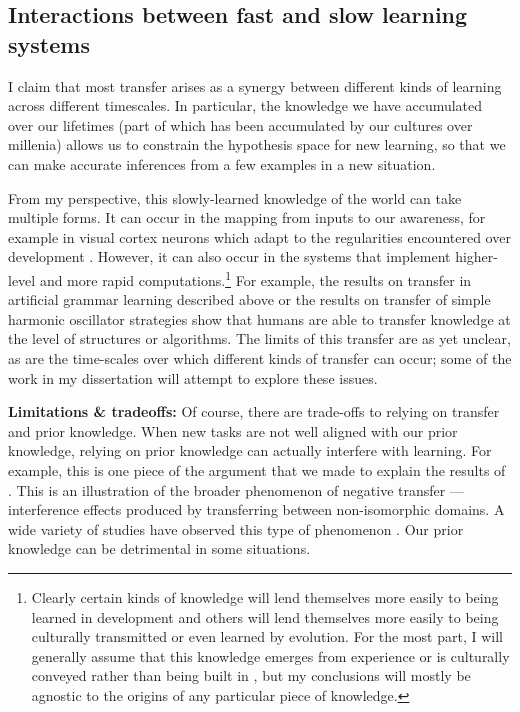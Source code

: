 \subsection{Interactions between fast and slow learning systems} \label{fast_slow_interactions}
I claim that most transfer arises as a synergy between different kinds of learning across different timescales. In particular, the knowledge we have accumulated over our lifetimes (part of which has been accumulated by our cultures over millenia) allows us to constrain the hypothesis space for new learning, so that we can make accurate inferences from a few examples in a new situation. \par 
From my perspective, this slowly-learned knowledge of the world can take multiple forms. It can occur in the mapping from inputs to our awareness, for example in visual cortex neurons which adapt to the regularities encountered over development \citep{Barlow1975}. However, it can also occur in the systems that implement higher-level and more rapid computations.\footnote{Clearly certain kinds of knowledge will lend themselves more easily to being learned in development and others will lend themselves more easily to being culturally transmitted or even learned by evolution. For the most part, I will generally assume that this knowledge emerges from experience or is culturally conveyed rather than being built in \citep{Hansen2017}, but my conclusions will mostly be agnostic to the origins of any particular piece of knowledge.} For example, the results on transfer in artificial grammar learning described above \citep{Tunney2001} or the results on transfer of simple harmonic oscillator strategies \citep{Day2011} show that humans are able to transfer knowledge at the level of structures or algorithms. The limits of this transfer are as yet unclear, as are the time-scales over which different kinds of transfer can occur; some of the work in my dissertation will attempt to explore these issues.\par  
\textbf{Limitations \& tradeoffs:} Of course, there are trade-offs to relying on transfer and prior knowledge. When new tasks are not well aligned with our prior knowledge, relying on prior knowledge can actually interfere with learning. For example, this is one piece of the argument that we made \citep{Lampinen2017b} to explain the results of \citet{Kaminski2008}. This is an illustration of the broader phenomenon of negative transfer --- interference effects produced by transferring between non-isomorphic domains. A wide variety of studies have observed this type of phenomenon \citep[e.g.][]{Luchins1942, Landrum2005}. Our prior knowledge can be detrimental in some situations. \par
